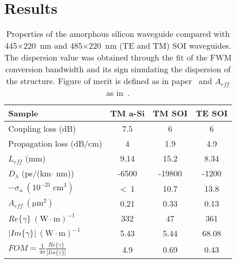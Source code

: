 \section{Results}

\begin{table}
\centering
\caption{Properties of the amorphous silicon waveguide compared with 445$\times$220~nm and 485$\times$220~nm (TE and TM) SOI waveguides.
The dispersion value was obtained through the fit of the FWM conversion bandwidth and its sign simulating the dispersion of the structure.
Figure of merit is defined as in paper~\cite{Koos2007} and ${A}_{eff}$ as in~\cite{Rukhlenko2012}.}
\begin{tabular}{l|ccc}
\hline
Sample & TM a-Si & TM SOI & TE SOI \\\hline
Coupling loss (dB) & 7.5 & 6 & 6\\
Propagation loss (dB/cm) & 4 & 1.9 & 4.9\\
$L_{eff}$ (mm) & 9.14 & 15.2 & 8.34\\
$D_\lambda$ (ps/(km$\cdot$ nm)) & -6500 & -19800 & -1200\\
$-\sigma_n ~ (10^{-21}~\mathrm{cm}^3) $  & \textless~1 & 10.7 & 13.8 \\ 
$ {A}_{eff}~ (\mathrm{\mu m}^2) $  & 0.21 & 0.33 & 0.13 \\ 
{$Re\{\gamma\} ~ (\mathrm{W}\cdot \mathrm{m})^{-1}$ } & 332 & 47 & 361\\
{$|Im\{\gamma\}| ~ (\mathrm{W}\cdot \mathrm{m})^{-1}$ } & 5.43 & 5.44 & 68.08\\
$ FOM = \frac{1}{4\pi} \frac{Re\{\gamma\}}{|Im\{\gamma\}|} $ & 4.9 & 0.69 & 0.43\\
\hline
\end{tabular}
\label{tab:resultsFOMpaper}
\end{table}



